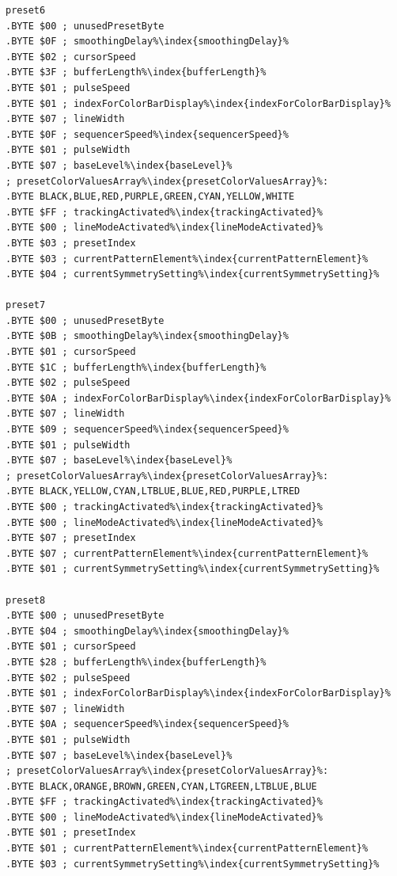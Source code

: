 \begin{minipage}[b]{0.33\linewidth}
\begin{lrbox}{\mybox}%
\begin{lstlisting}[basicstyle=\ttfamily\tiny,escapechar=\%]
preset6
.BYTE $00 ; unusedPresetByte
.BYTE $0F ; smoothingDelay%\index{smoothingDelay}%
.BYTE $02 ; cursorSpeed
.BYTE $3F ; bufferLength%\index{bufferLength}%
.BYTE $01 ; pulseSpeed
.BYTE $01 ; indexForColorBarDisplay%\index{indexForColorBarDisplay}%
.BYTE $07 ; lineWidth
.BYTE $0F ; sequencerSpeed%\index{sequencerSpeed}%
.BYTE $01 ; pulseWidth
.BYTE $07 ; baseLevel%\index{baseLevel}%
; presetColorValuesArray%\index{presetColorValuesArray}%: 
.BYTE BLACK,BLUE,RED,PURPLE,GREEN,CYAN,YELLOW,WHITE
.BYTE $FF ; trackingActivated%\index{trackingActivated}%
.BYTE $00 ; lineModeActivated%\index{lineModeActivated}%
.BYTE $03 ; presetIndex
.BYTE $03 ; currentPatternElement%\index{currentPatternElement}%
.BYTE $04 ; currentSymmetrySetting%\index{currentSymmetrySetting}%

preset7
.BYTE $00 ; unusedPresetByte
.BYTE $0B ; smoothingDelay%\index{smoothingDelay}%
.BYTE $01 ; cursorSpeed
.BYTE $1C ; bufferLength%\index{bufferLength}%
.BYTE $02 ; pulseSpeed
.BYTE $0A ; indexForColorBarDisplay%\index{indexForColorBarDisplay}%
.BYTE $07 ; lineWidth
.BYTE $09 ; sequencerSpeed%\index{sequencerSpeed}%
.BYTE $01 ; pulseWidth
.BYTE $07 ; baseLevel%\index{baseLevel}%
; presetColorValuesArray%\index{presetColorValuesArray}%: 
.BYTE BLACK,YELLOW,CYAN,LTBLUE,BLUE,RED,PURPLE,LTRED
.BYTE $00 ; trackingActivated%\index{trackingActivated}%
.BYTE $00 ; lineModeActivated%\index{lineModeActivated}%
.BYTE $07 ; presetIndex
.BYTE $07 ; currentPatternElement%\index{currentPatternElement}%
.BYTE $01 ; currentSymmetrySetting%\index{currentSymmetrySetting}%

preset8
.BYTE $00 ; unusedPresetByte
.BYTE $04 ; smoothingDelay%\index{smoothingDelay}%
.BYTE $01 ; cursorSpeed
.BYTE $28 ; bufferLength%\index{bufferLength}%
.BYTE $02 ; pulseSpeed
.BYTE $01 ; indexForColorBarDisplay%\index{indexForColorBarDisplay}%
.BYTE $07 ; lineWidth
.BYTE $0A ; sequencerSpeed%\index{sequencerSpeed}%
.BYTE $01 ; pulseWidth
.BYTE $07 ; baseLevel%\index{baseLevel}%
; presetColorValuesArray%\index{presetColorValuesArray}%: 
.BYTE BLACK,ORANGE,BROWN,GREEN,CYAN,LTGREEN,LTBLUE,BLUE
.BYTE $FF ; trackingActivated%\index{trackingActivated}%
.BYTE $00 ; lineModeActivated%\index{lineModeActivated}%
.BYTE $01 ; presetIndex
.BYTE $01 ; currentPatternElement%\index{currentPatternElement}%
.BYTE $03 ; currentSymmetrySetting%\index{currentSymmetrySetting}%


\end{lstlisting}
\end{lrbox}
\end{minipage}
